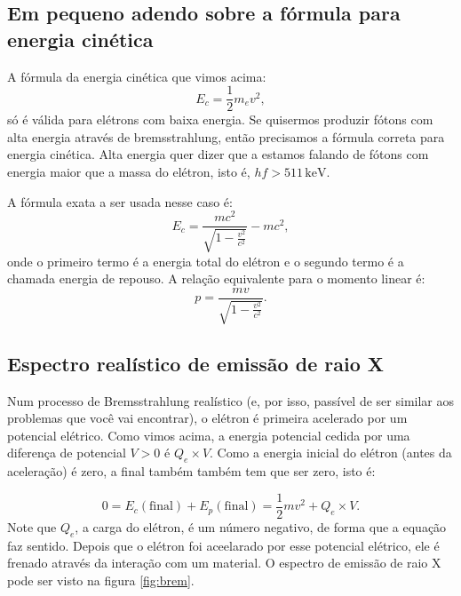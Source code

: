\documentclass{article}
\begin{document}
\subsection{Em pequeno adendo sobre a f\'ormula para energia cin\'etica}

A f\'ormula da energia cin\'etica que vimos acima:
\begin{equation}
E_c = \frac{1}{2}m_ev^2,
\end{equation}
s\'o \'e v\'alida para el\'etrons com baixa energia. Se quisermos produzir f\'otons com alta energia atrav\'es de bremsstrahlung, ent\~ao precisamos a f\'ormula correta para energia cin\'etica. Alta energia quer dizer que a estamos falando de f\'otons com energia maior que a massa do el\'etron, isto \'e, $hf > 511\,\text{keV}$.

A f\'ormula exata a ser usada nesse caso \'e:
\begin{equation}
E_c = \frac{mc^{2}}{\sqrt{1-\frac{v^2}{c^2}}} - mc^2,
\end{equation}
onde o primeiro termo \'e a energia total do el\'etron e o segundo termo \'e a chamada energia de repouso. A rela\c c\~ao equivalente para o momento linear \'e:
\begin{equation}
p = \frac{mv}{\sqrt{1-\frac{v^2}{c^2}}}.
\end{equation}

\subsection{Espectro real\'istico de emissão de raio X}
Num processo de Bremsstrahlung real\'istico (e, por isso, pass\'ivel de ser similar aos problemas que voc\^e vai encontrar), o el\'etron \'e primeira acelerado por um potencial el\'etrico. Como vimos acima, a energia potencial cedida por uma diferen\c ca de potencial $V>0$ \'e $Q_e\times V$. Como a energia inicial do el\'etron (antes da acelera\c c\~ao) \'e zero, a final tamb\'em tamb\'em tem que ser zero, isto \'e:

\begin{equation}
0 = E_c(\text{final}) + E_p(\text{final}) = \frac{1}{2}mv^2 + Q_e\times V.
\end{equation}
Note que $Q_e$, a carga do el\'etron, \'e um n\'umero negativo, de forma que a equa\c c\~ao faz sentido. Depois que o el\'etron foi aceelarado por esse potencial el\'etrico, ele \'e frenado atrav\'es da intera\c c\~ao com um material. O espectro de emiss\~ao de raio X pode ser visto na figura \ref{fig:brem}.
\end{document}
